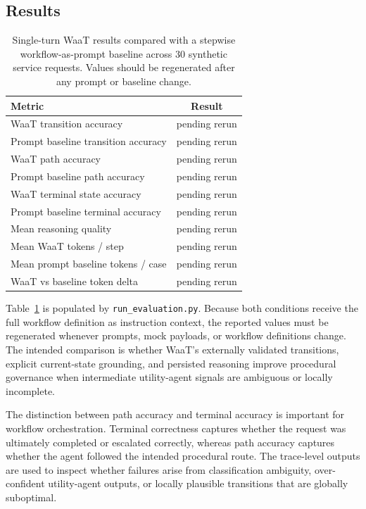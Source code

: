 \documentclass[10pt,conference]{IEEEtran}
\begin{document}
\subsection{Results}
\label{sec:results}

\begin{table}[t]
\centering
\caption{Single-turn WaaT results compared with a stepwise
workflow-as-prompt baseline across 30 synthetic service requests.
Values should be regenerated after any prompt or baseline change.}
\label{tab:waat-results}
\begin{tabular}{lc}
\hline
\textbf{Metric} & \textbf{Result} \\
\hline
WaaT transition accuracy             & pending rerun \\
Prompt baseline transition accuracy  & pending rerun \\
WaaT path accuracy                   & pending rerun \\
Prompt baseline path accuracy        & pending rerun \\
WaaT terminal state accuracy         & pending rerun \\
Prompt baseline terminal accuracy    & pending rerun \\
Mean reasoning quality               & pending rerun \\
Mean WaaT tokens / step              & pending rerun \\
Mean prompt baseline tokens / case   & pending rerun \\
WaaT vs baseline token delta         & pending rerun \\
\hline
\end{tabular}
\end{table}

Table~\ref{tab:waat-results} is populated by
\texttt{run\_evaluation.py}.  Because both conditions receive the
full workflow definition as instruction context, the reported
values must be regenerated whenever prompts, mock payloads, or
workflow definitions change.  The intended comparison is whether
WaaT's externally validated transitions, explicit current-state
grounding, and persisted reasoning improve procedural governance
when intermediate utility-agent signals are ambiguous or locally
incomplete.

The distinction between path accuracy and terminal accuracy is
important for workflow orchestration.  Terminal correctness
captures whether the request was ultimately completed or escalated
correctly, whereas path accuracy captures whether the agent
followed the intended procedural route.  The trace-level outputs
are used to inspect whether failures arise from classification
ambiguity, over-confident utility-agent outputs, or locally
plausible transitions that are globally suboptimal.
\end{document}
